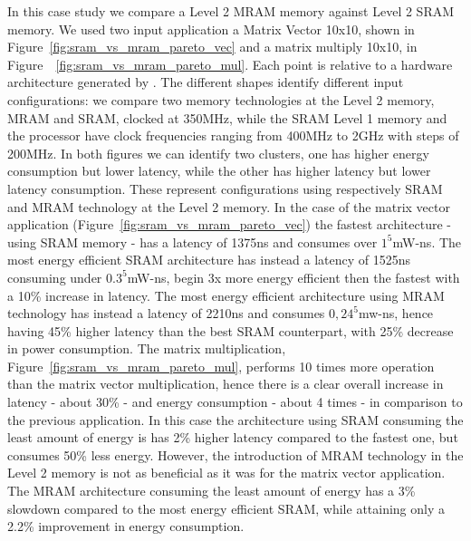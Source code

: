 In this case study we compare a Level 2 MRAM memory against Level 2 SRAM memory. We used two input application a Matrix Vector 10x10, shown in Figure~\ref{fig:sram_vs_mram_pareto_vec} and a matrix multiply 10x10, in Figure~~\ref{fig:sram_vs_mram_pareto_mul}. Each point is relative to a hardware architecture generated by \frameworkname. The different shapes identify different input configurations: we compare two memory technologies at the Level 2 memory, MRAM and SRAM, clocked at 350MHz, while the SRAM Level 1 memory and the processor have clock frequencies ranging from 400MHz to 2GHz with steps of 200MHz. In both figures we can identify two clusters, one has higher energy consumption but lower latency, while the other has higher latency but lower latency consumption. These represent  configurations using respectively SRAM and MRAM technology at the Level 2 memory. In the case of the matrix vector application (Figure~\ref{fig:sram_vs_mram_pareto_vec}) the fastest architecture - using SRAM memory - has a latency of 1375ns and consumes over $1^5$mW-ns. The most energy efficient SRAM architecture has instead a latency of 1525ns consuming under $0.3^5$mW-ns, begin 3x more energy efficient then the fastest with a 10\% increase in latency. The most energy efficient architecture using MRAM technology has instead a latency of 2210ns and consumes $0,24^5$mw-ns, hence having 45\% higher latency than the best SRAM counterpart, with 25\% decrease in power consumption. The matrix multiplication, Figure~\ref{fig:sram_vs_mram_pareto_mul}, performs 10 times more operation than the matrix vector multiplication, hence there is a clear overall increase in latency - about 30\% - and energy consumption - about 4 times -  in comparison to the previous application. In this case the architecture using SRAM consuming the least amount of energy is has 2\% higher latency compared to the fastest one, but consumes 50\% less energy. However, the introduction of MRAM technology in the Level 2 memory is not as beneficial as it was for the matrix vector application. The MRAM architecture consuming the least amount of energy has a 3\% slowdown compared to the most energy efficient SRAM, while attaining only a 2.2\% improvement in energy consumption. 



